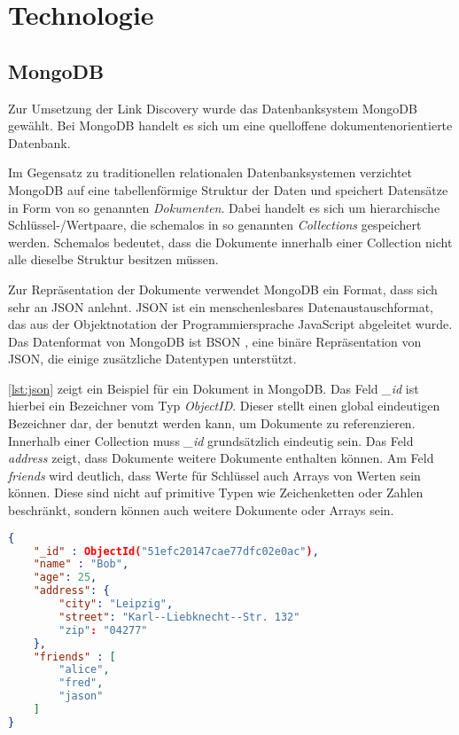 \section{Technologie}

\subsection{MongoDB}
\label{mongo}

Zur Umsetzung der Link Discovery wurde das Datenbanksystem MongoDB \cite{mo2013} gewählt. Bei MongoDB handelt es sich um eine quelloffene dokumentenorientierte Datenbank.

Im Gegensatz zu traditionellen relationalen Datenbanksystemen verzichtet MongoDB auf eine tabellenförmige Struktur der Daten und speichert Datensätze in Form von so genannten \emph{Dokumenten}. Dabei handelt es sich um hierarchische Schlüssel-/Wertpaare, die schemalos in so genannten \emph{Collections} gespeichert werden. Schemalos bedeutet, dass die Dokumente innerhalb einer Collection nicht alle dieselbe Struktur besitzen müssen.

Zur Repräsentation der Dokumente verwendet MongoDB ein Format, dass sich sehr an JSON \cite{json2006} anlehnt. JSON ist ein menschenlesbares Datenaustauschformat, das aus der Objektnotation der Programmiersprache JavaScript abgeleitet wurde. Das Datenformat von MongoDB ist BSON \cite{bson2013}, eine binäre Repräsentation von JSON, die einige zusätzliche Datentypen unterstützt. 

\cref{lst:json} zeigt ein Beispiel für ein Dokument in MongoDB. Das Feld \emph{\_id} ist hierbei ein  Bezeichner vom Typ \emph{ObjectID}. Dieser stellt einen global eindeutigen Bezeichner dar, der benutzt werden kann, um Dokumente zu referenzieren. Innerhalb einer Collection muss \emph{\_id} grundsätzlich eindeutig sein. Das Feld \emph{address} zeigt, dass Dokumente weitere Dokumente enthalten können. Am Feld \emph{friends} wird deutlich, dass Werte für Schlüssel auch Arrays von Werten sein können. Diese sind nicht auf primitive Typen wie Zeichenketten oder Zahlen beschränkt, sondern können auch weitere Dokumente oder Arrays sein.

\begin{lstlisting}[language=json, label={lst:json}, caption={Ein Beispiel für ein Dokument in MongoDB}]
{
    "_id" : ObjectId("51efc20147cae77dfc02e0ac"),
    "name" : "Bob",
    "age": 25,
    "address": {
        "city": "Leipzig",
        "street": "Karl--Liebknecht--Str. 132"
        "zip": "04277"
    },
    "friends" : [
        "alice",
        "fred",
        "jason"
    ]
}
\end{lstlisting}

